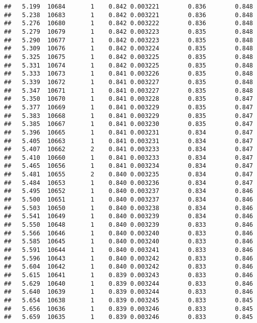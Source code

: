 \documentclass[
]{book}
\begin{document}
\begin{verbatim}
##   5.199  10684       1    0.842 0.003221        0.836        0.848
##   5.238  10683       1    0.842 0.003221        0.836        0.848
##   5.276  10680       1    0.842 0.003222        0.836        0.848
##   5.279  10679       1    0.842 0.003223        0.835        0.848
##   5.290  10677       1    0.842 0.003223        0.835        0.848
##   5.309  10676       1    0.842 0.003224        0.835        0.848
##   5.325  10675       1    0.842 0.003225        0.835        0.848
##   5.331  10674       1    0.842 0.003225        0.835        0.848
##   5.333  10673       1    0.841 0.003226        0.835        0.848
##   5.339  10672       1    0.841 0.003227        0.835        0.848
##   5.347  10671       1    0.841 0.003227        0.835        0.848
##   5.350  10670       1    0.841 0.003228        0.835        0.847
##   5.377  10669       1    0.841 0.003229        0.835        0.847
##   5.383  10668       1    0.841 0.003229        0.835        0.847
##   5.385  10667       1    0.841 0.003230        0.835        0.847
##   5.396  10665       1    0.841 0.003231        0.834        0.847
##   5.405  10663       1    0.841 0.003231        0.834        0.847
##   5.407  10662       2    0.841 0.003233        0.834        0.847
##   5.410  10660       1    0.841 0.003233        0.834        0.847
##   5.465  10656       1    0.841 0.003234        0.834        0.847
##   5.481  10655       2    0.840 0.003235        0.834        0.847
##   5.484  10653       1    0.840 0.003236        0.834        0.847
##   5.495  10652       1    0.840 0.003237        0.834        0.846
##   5.500  10651       1    0.840 0.003237        0.834        0.846
##   5.503  10650       1    0.840 0.003238        0.834        0.846
##   5.541  10649       1    0.840 0.003239        0.834        0.846
##   5.550  10648       1    0.840 0.003239        0.833        0.846
##   5.566  10646       1    0.840 0.003240        0.833        0.846
##   5.585  10645       1    0.840 0.003240        0.833        0.846
##   5.591  10644       1    0.840 0.003241        0.833        0.846
##   5.596  10643       1    0.840 0.003242        0.833        0.846
##   5.604  10642       1    0.840 0.003242        0.833        0.846
##   5.615  10641       1    0.839 0.003243        0.833        0.846
##   5.629  10640       1    0.839 0.003244        0.833        0.846
##   5.640  10639       1    0.839 0.003244        0.833        0.846
##   5.654  10638       1    0.839 0.003245        0.833        0.845
##   5.656  10636       1    0.839 0.003246        0.833        0.845
##   5.659  10635       1    0.839 0.003246        0.833        0.845

\end{verbatim}
\end{document}
